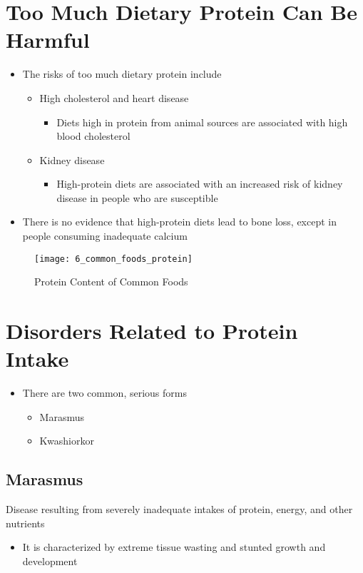 \documentclass[title={Chapter 6}]{fdsn201notes}
\begin{document}
\section{Too Much Dietary Protein Can Be Harmful}\label{sec:too-much-dietary-protein-can-be-harmful}
\begin{itemize}
	\item The risks of too much dietary protein include
	\begin{itemize}
		\item High cholesterol and heart disease
		\begin{itemize}
			\item Diets high in protein from animal sources are associated with high blood cholesterol
		\end{itemize}
		\item Kidney disease
		\begin{itemize}
			\item High-protein diets are associated with an increased risk of kidney disease in people who are susceptible
		\end{itemize}
	\end{itemize}
	\item There is no evidence that high-protein diets lead to bone loss, except in people consuming inadequate calcium
\end{itemize}

\begin{figure}[H]
	\centering
	\texttt{[image: 6\_common\_foods\_protein]}
	\caption{Protein Content of Common Foods}
	\label{fig:protein-content-of-common-foods}
\end{figure}

\section{Disorders Related to Protein Intake}\label{sec:disorders-related-to-protein-intake}
\begin{itemize}
	\item There are two common, serious forms
	\begin{itemize}
		\item Marasmus
		\item Kwashiorkor
	\end{itemize}
\end{itemize}

\subsection{Marasmus}\label{subsec:marasmus}
Disease resulting from severely inadequate intakes of protein, energy, and other nutrients
\begin{itemize}
	\item It is characterized by extreme tissue wasting and stunted growth and development
\end{itemize}
\end{document}
